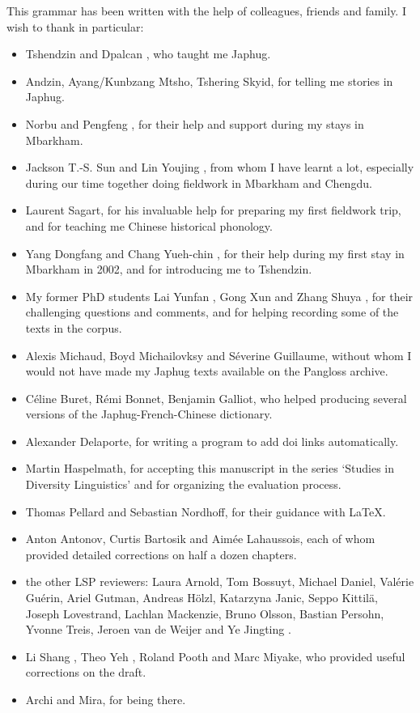 %
%

This grammar has been written with the help of colleagues, friends and family. I wish to thank in particular:

\begin{itemize}
	\item Tshendzin  and  Dpalcan , who taught me Japhug.
	\item Andzin, Ayang/Kunbzang Mtsho,   Tshering Skyid, for telling me stories in Japhug.
	\item Norbu  and Pengfeng , for their help and support during my stays in Mbarkham.
	\item Jackson T.-S. Sun  and Lin Youjing , from whom I have learnt a lot, especially during our time together doing fieldwork in Mbarkham and Chengdu.	
	\item Laurent Sagart, for his invaluable help for preparing my first fieldwork trip, and for teaching me Chinese historical phonology.
	\item 	Yang Dongfang  and Chang Yueh-chin , for their help during my first stay in Mbarkham in 2002, and for introducing me to Tshendzin.
	\item My former PhD students Lai Yunfan , Gong Xun  and Zhang Shuya , for their challenging questions and comments, and for helping recording some of the texts in the corpus.
	\item Alexis Michaud, Boyd Michailovksy and Séverine Guillaume, without whom I would not have made my Japhug texts available on the Pangloss archive.
	\item Céline Buret, Rémi Bonnet, Benjamin Galliot, who helped producing several versions of the Japhug-French-Chinese dictionary.
	\item Alexander Delaporte, for writing a program to add doi links automatically.
	\item Martin Haspelmath, for accepting this manuscript in the series `Studies in Diversity Linguistics' and for organizing the evaluation process.
	\item Thomas Pellard and Sebastian Nordhoff, for their guidance with \LaTeX.
	\item Anton Antonov, Curtis Bartosik and Aimée Lahaussois, each of whom provided detailed corrections on half a dozen chapters.
	\item the other LSP reviewers: Laura Arnold, Tom Bossuyt, Michael Daniel, Valérie Guérin, Ariel Gutman, Andreas Hölzl, Katarzyna Janic, Seppo Kittilä, Joseph Lovestrand, Lachlan Mackenzie, Bruno Olsson, Bastian Persohn, Yvonne Treis, Jeroen van de Weijer and Ye Jingting  .
	\item Li Shang , Theo Yeh , Roland Pooth and Marc Miyake, who provided useful corrections on the draft.
	\item Archi and Mira, for being there.
\end{itemize}
